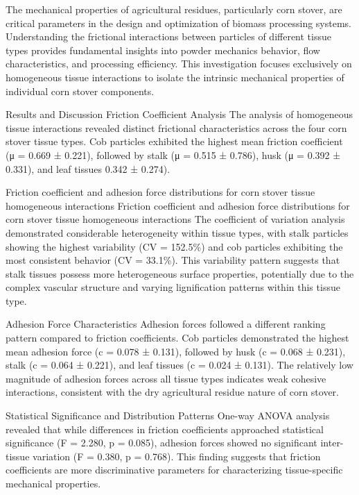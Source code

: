 \documentclass[xcolor=dvipsnames,10pt,hidelinks]{article}
\begin{document}
The mechanical properties of agricultural residues, particularly corn stover, are critical parameters in the design and optimization of biomass processing systems. Understanding the frictional interactions between particles of different tissue types provides fundamental insights into powder mechanics behavior, flow characteristics, and processing efficiency. This investigation focuses exclusively on homogeneous tissue interactions to isolate the intrinsic mechanical properties of individual corn stover components.

Results and Discussion
Friction Coefficient Analysis
The analysis of homogeneous tissue interactions revealed distinct frictional characteristics across the four corn stover tissue types. Cob particles exhibited the highest mean friction coefficient (μ = 0.669 ± 0.221), followed by stalk (μ = 0.515 ± 0.786), husk (μ = 0.392 ± 0.331), and leaf tissues 0.342 ± 0.274).

Friction coefficient and adhesion force distributions for corn stover tissue homogeneous interactions
Friction coefficient and adhesion force distributions for corn stover tissue homogeneous interactions
The coefficient of variation analysis demonstrated considerable heterogeneity within tissue types, with stalk particles showing the highest variability (CV = 152.5\%) and cob particles exhibiting the most consistent behavior (CV = 33.1\%). This variability pattern suggests that stalk tissues possess more heterogeneous surface properties, potentially due to the complex vascular structure and varying lignification patterns within this tissue type.

Adhesion Force Characteristics
Adhesion forces followed a different ranking pattern compared to friction coefficients. Cob particles demonstrated the highest mean adhesion force (c = 0.078 ± 0.131), followed by husk (c = 0.068 ± 0.231), stalk (c = 0.064 ± 0.221), and leaf tissues (c = 0.024 ± 0.131). The relatively low magnitude of adhesion forces across all tissue types indicates weak cohesive interactions, consistent with the dry agricultural residue nature of corn stover.

Statistical Significance and Distribution Patterns
One-way ANOVA analysis revealed that while differences in friction coefficients approached statistical significance (F = 2.280, p = 0.085), adhesion forces showed no significant inter-tissue variation (F = 0.380, p = 0.768). This finding suggests that friction coefficients are more discriminative parameters for characterizing tissue-specific mechanical properties.
\end{document}

